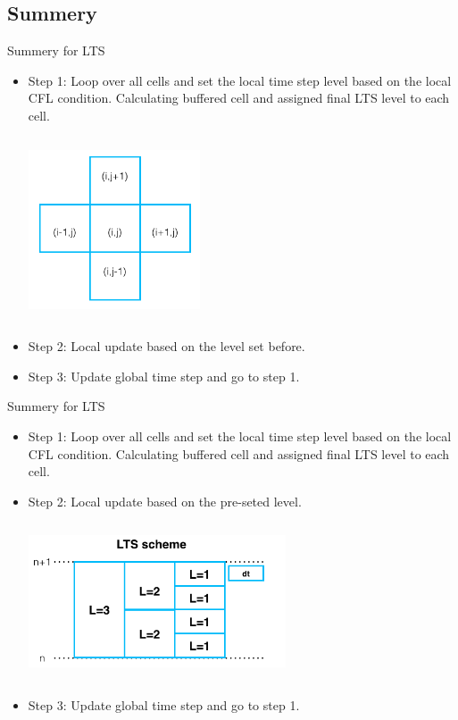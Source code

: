 \documentclass{beamer}
\begin{document}
\subsection{Summery}
\begin{frame}{Summery for LTS}
\begin{itemize}
      \item Step 1: Loop over all cells and set the local time step level based on the local CFL condition. Calculating buffered cell and assigned final LTS level to each cell.
      \begin{columns}
      \begin{column}{2in}
        \includegraphics[width=2.0in]{cell_value}
      \end{column}
    \end{columns}
      \item Step 2: Local update based on the level set before.
      \item Step 3: Update global time step and go to step 1.
    \end{itemize}
\end{frame}
\begin{frame}{Summery for LTS}
\begin{itemize}
      \item Step 1: Loop over all cells and set the local time step level based on the local CFL condition. Calculating buffered cell and assigned final LTS level to each cell.
      
      \item Step 2: Local update based on the pre-seted level.
      \begin{columns}
      \begin{column}{3in}
        \includegraphics[width=3in]{LTS_scheme}
      \end{column}
    \end{columns}
      \item Step 3: Update global time step and go to step 1.
    \end{itemize}
\end{frame}
\end{document}
